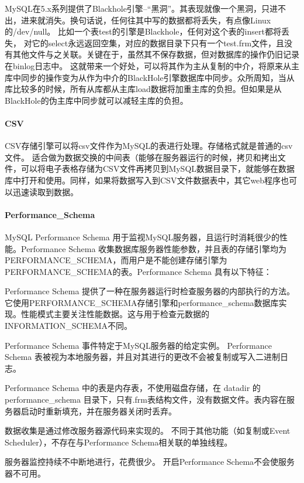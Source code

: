 \documentclass[../../../interview-questions.tex]{subfiles}
\begin{document}
MySQL在5.x系列提供了Blackhole引擎–“黑洞”。其表现就像一个黑洞，只进不出，进来就消失。换句话说，任何往其中写的数据都将丢失，有点像Linux的/dev/null。
比如一个表test的引擎是Blackhole，任何对这个表的insert都将丢失，
对它的select永远返回空集，对应的数据目录下只有一个test.frm文件，且没有其他文件与之关联。关键在于，虽然其不保存数据，但对数据库的操作仍旧记录在binlog日志中。
这就带来一个好处，可以将其作为主从复制的中介，将原来从主库中同步的操作变为从作为中介的BlackHole引擎数据库中同步。众所周知，当从库比较多的时候，所有从库都从主库load数据将加重主库的负担。但如果是从BlackHole的伪主库中同步就可以减轻主库的负担。


\paragraph{CSV}

CSV存储引擎可以将csv文件作为MySQL的表进行处理。存储格式就是普通的csv文件。    适合做为数据交换的中间表（能够在服务器运行的时候，拷贝和拷出文件，可以将电子表格存储为CSV文件再拷贝到MySQL数据目录下，就能够在数据库中打开和使用。同样，如果将数据写入到CSV文件数据表中，其它web程序也可以迅速读取到数据。


\paragraph{Performance\_Schema}

MySQL Performance Schema  用于监视MySQL服务器，且运行时消耗很少的性能。Performance Schema 收集数据库服务器性能参数，并且表的存储引擎均为PERFORMANCE\_SCHEMA，而用户是不能创建存储引擎为PERFORMANCE\_SCHEMA的表。Performance Schema 具有以下特征：

Performance Schema 提供了一种在服务器运行时检查服务器的内部执行的方法。它使用PERFORMANCE\_SCHEMA存储引擎和performance\_schema数据库实现。性能模式主要关注性能数据。这与用于检查元数据的INFORMATION\_SCHEMA不同。

Performance Schema 事件特定于MySQL服务器的给定实例。 Performance Schema 表被视为本地服务器，并且对其进行的更改不会被复制或写入二进制日志。

Performance Schema 中的表是内存表，不使用磁盘存储，在 datadir 的 performance\_schema 目录下，只有.frm表结构文件，没有数据文件。表内容在服务器启动时重新填充，并在服务器关闭时丢弃。

数据收集是通过修改服务器源代码来实现的。 不同于其他功能（如复制或Event Scheduler），不存在与Performance Schema相关联的单独线程。

服务器监控持续不中断地进行，花费很少。 开启Performance Schema不会使服务器不可用。
\end{document}
